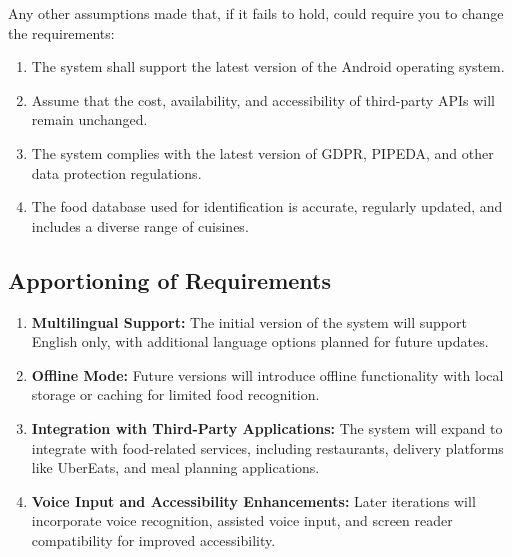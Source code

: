 \documentclass[]{article}
\begin{document}
Any other assumptions made that, if it fails to hold, could require you to change the requirements:
	\begin{enumerate}
		\item The system shall support the latest version of the Android operating system.
		\item Assume that the cost, availability, and accessibility of third-party APIs will remain unchanged.
		\item The system complies with the latest version of GDPR, PIPEDA, and other data protection regulations.
		\item The food database used for identification is accurate, regularly updated, and includes a diverse range of cuisines.
	\end{enumerate}


\subsection{Apportioning of Requirements}
\label{sub:apportioning_of_requirements}
\begin{enumerate}
    \item \textbf{Multilingual Support:} The initial version of the system will support English only, with additional language options planned for future updates.
    \item \textbf{Offline Mode:} Future versions will introduce offline functionality with local storage or caching for limited food recognition.
    \item \textbf{Integration with Third-Party Applications:} The system will expand to integrate with food-related services, including restaurants, delivery platforms like UberEats, and meal planning applications.
    \item \textbf{Voice Input and Accessibility Enhancements:} Later iterations will incorporate voice recognition, assisted voice input, and screen reader compatibility for improved accessibility.
\end{enumerate}

\end{document}
